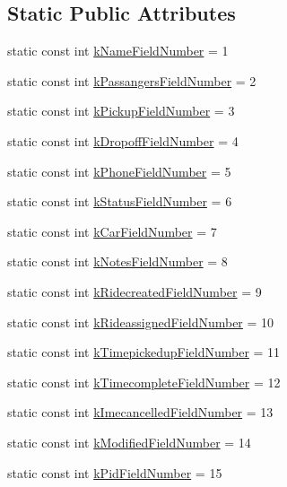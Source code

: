 \subsection*{Static Public Attributes}
\begin{DoxyCompactItemize}
\item 
static const int \hyperlink{classPatronInfo_ab205c98473d062e4efb0335340766785}{k\-Name\-Field\-Number} = 1
\item 
static const int \hyperlink{classPatronInfo_a9293f9c368f4a26dae441b8be1bc0a48}{k\-Passangers\-Field\-Number} = 2
\item 
static const int \hyperlink{classPatronInfo_a62a97ad57161f8a87c7a80f0c4a13be8}{k\-Pickup\-Field\-Number} = 3
\item 
static const int \hyperlink{classPatronInfo_a744e51ac6826fd2db657345aa73d87c4}{k\-Dropoff\-Field\-Number} = 4
\item 
static const int \hyperlink{classPatronInfo_a3b10e13c85c247bbfeb1633349e44510}{k\-Phone\-Field\-Number} = 5
\item 
static const int \hyperlink{classPatronInfo_aafe92efae284bea41a79af07b83773d4}{k\-Status\-Field\-Number} = 6
\item 
static const int \hyperlink{classPatronInfo_a65b3f7715ed1dab1b6c1ba7ba3b2afd7}{k\-Car\-Field\-Number} = 7
\item 
static const int \hyperlink{classPatronInfo_a7abbec939f6e7af594c76e389f015088}{k\-Notes\-Field\-Number} = 8
\item 
static const int \hyperlink{classPatronInfo_a645a316e084faa455b79f1c5d128eda9}{k\-Ridecreated\-Field\-Number} = 9
\item 
static const int \hyperlink{classPatronInfo_aff3777be2a5d0934195ba5ed8787e3c2}{k\-Rideassigned\-Field\-Number} = 10
\item 
static const int \hyperlink{classPatronInfo_a7abc29d4863fc09c1efa54270b7a8da1}{k\-Timepickedup\-Field\-Number} = 11
\item 
static const int \hyperlink{classPatronInfo_ab494da2e488d26bdb450fd6a2e1956aa}{k\-Timecomplete\-Field\-Number} = 12
\item 
static const int \hyperlink{classPatronInfo_ad0bac69b4ef8c8c239051bf8e260f9aa}{k\-Imecancelled\-Field\-Number} = 13
\item 
static const int \hyperlink{classPatronInfo_a72164d83ef4f339fea868b67b69b8696}{k\-Modified\-Field\-Number} = 14
\item 
static const int \hyperlink{classPatronInfo_a6e42e11ca2aec51757ccde9474792b10}{k\-Pid\-Field\-Number} = 15
\end{DoxyCompactItemize}
